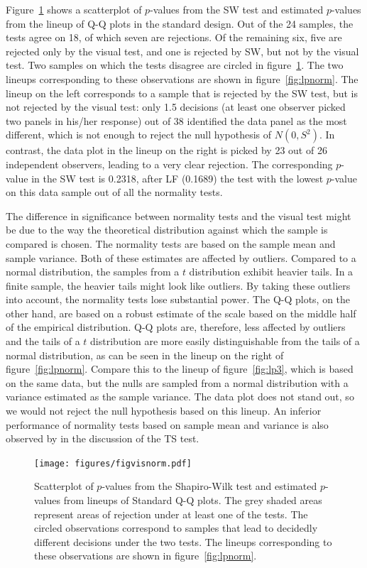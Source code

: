 \documentclass{article}\usepackage[]{graphicx}\usepackage[]{color}
\begin{document}
Figure~\ref{fig:visnorm} shows a scatterplot of $p$-values from the SW test and estimated $p$-values from the lineup of Q-Q plots in the standard design. Out of the 24 samples, the tests agree on 18, of which seven are rejections. Of the remaining six, five are rejected only by the visual test, and one is rejected by SW, but not by the visual test. Two samples on which the tests disagree are circled in figure~\ref{fig:visnorm}. The two lineups corresponding to these observations are shown in figure~\ref{fig:lpnorm}. The lineup on the left corresponds to a sample that is rejected by the SW test, but is not rejected by the visual test: only 1.5 decisions (at least one observer picked two panels in his/her response) out of 38 identified the data panel as the most different, which is not enough to reject the null hypothesis of $N(0, S^2)$. 
In contrast, the data plot in the  lineup on the right is picked by 23 out of 26 independent observers, leading to a very clear rejection. 
The corresponding $p$-value in the SW test is 0.2318, after LF (0.1689) the test with the lowest $p$-value on this data sample out of all the normality tests.

The difference in significance between normality tests and the visual test might be due to the way the theoretical distribution against which the sample is compared is chosen. The normality tests are based on the sample mean and sample variance. Both of these estimates are affected by outliers. Compared to a normal distribution, the samples from a $t$ distribution exhibit heavier tails. In a finite sample, the heavier tails might look like outliers. By taking these outliers into account, the normality tests lose substantial power. The Q-Q plots, on the other hand, are based on a robust estimate of the scale based on the middle half of the empirical distribution. Q-Q plots are, therefore, less affected by outliers and the tails of a $t$ distribution are more easily distinguishable from the tails of a normal distribution, as can be seen in the lineup on the right of figure~\ref{fig:lpnorm}. Compare this to the lineup of figure~\ref{fig:lp3}, which is based on the same data, but the nulls are sampled from a normal distribution with a variance estimated as the sample variance. The data plot does not stand out, so we would not reject the null hypothesis based on this lineup. 
An inferior performance of normality tests based on sample mean and variance is also observed by \cite{buja:2013} in the discussion of the TS test. 
\begin{figure}
\centering
\texttt{[image: figures/figvisnorm.pdf]} 
\caption{\label{fig:visnorm}  Scatterplot of $p$-values from the Shapiro-Wilk test and estimated $p$-values from lineups of Standard Q-Q plots. The grey shaded areas represent areas of rejection under at least one of the tests. The circled observations correspond to samples that lead to decidedly different decisions under the two tests. The lineups corresponding to these observations are shown in figure~\ref{fig:lpnorm}.}
\end{figure}
\end{document}
